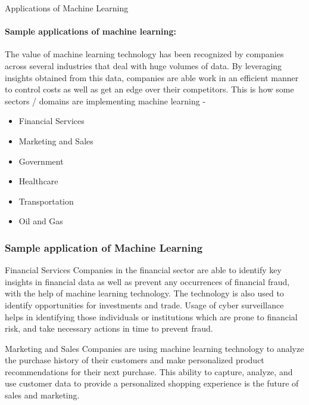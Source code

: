 \documentclass{beamer}
\begin{document}
\begin{frame}{Applications of Machine Learning}
  \framesubtitle{Sample applications of machine learning:}
  The value of machine learning technology has been recognized by companies across several industries that deal with huge volumes of data. By leveraging insights obtained from this data, companies are able work in an efficient manner to control costs as well as get an edge over their competitors. This is how some sectors / domains are implementing machine learning -
  \begin{itemize}
      \item Financial Services
      \item Marketing and Sales
      \item Government
      \item Healthcare
      \item Transportation
      \item Oil and Gas
  \end{itemize}
 
\end{frame}
\begin{frame}
\frametitle{Sample application of Machine Learning}
 
\begin{block}{Financial Services}
Companies in the financial sector are able to identify key insights in financial data as well as prevent any occurrences of financial fraud, with the help of machine learning technology. The technology is also used to identify opportunities for investments and trade. Usage of cyber surveillance helps in identifying those individuals or institutions which are prone to financial risk, and take necessary actions in time to prevent fraud.
\end{block}
 
\begin{block}{Marketing and Sales}
Companies are using machine learning technology to analyze the purchase history of their customers and make personalized product recommendations for their next purchase. This ability to capture, analyze, and use customer data to provide a personalized shopping experience is the future of sales and marketing.
\end{block}
\end{frame}
\end{document}
